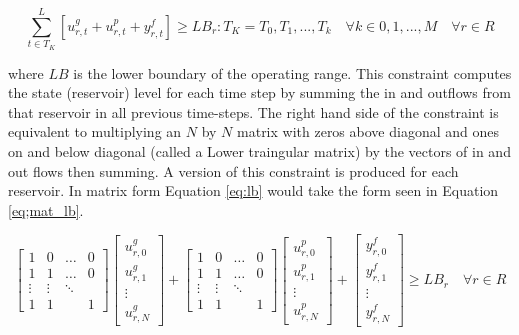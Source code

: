 \documentclass[12pt]{article}
\begin{document}
\begin{equation}
	\sum_{t\in T_K}^{L}[u_{r,t}^{g}+u_{r,t}^{p}+y_{r,t}^{f}]\geq LB_{r} : T_K=T_0,T_1,...,T_k \quad\forall k \in 0,1,...,M \quad\forall r \in R \label{eq:lb}
\end{equation}

where $LB$ is the lower boundary of the operating range. This constraint computes the state (reservoir) level for each time step by summing the in and outflows from that reservoir in all previous time-steps. The right hand side of the constraint is equivalent to multiplying an $N$ by $N$ matrix with zeros above diagonal and ones on and below diagonal (called a Lower traingular matrix) by the vectors of in and out flows then summing. A version of this constraint is produced for each reservoir. In matrix form Equation \eqref{eq:lb} would take the form seen in Equation \eqref{eq;mat_lb}.

\begin{equation}
	\begin{bmatrix}
		1 & 0 & \dots & 0\\
		1 & 1 & \dots & 0\\
		\vdots & \vdots &\ddots & \\
		1 & 1 & & 1
	\end{bmatrix}
	\begin{bmatrix}
		u_{r,0}^g \\ u_{r,1}^g \\ \vdots \\ u_{r,N}^g
	\end{bmatrix}+
	\begin{bmatrix}
		1 & 0 & \dots & 0\\
		1 & 1 & \dots & 0\\
		\vdots & \vdots &\ddots & \\
		1 & 1 & & 1
	\end{bmatrix}
	\begin{bmatrix}
		u_{r,0}^p \\ u_{r,1}^p \\ \vdots \\ u_{r,N}^p
	\end{bmatrix}+
	\begin{bmatrix}
		y_{r,0}^f \\ y_{r,1}^f \\ \vdots \\ y_{r,N}^f
	\end{bmatrix}\geq LB_r \quad \forall r \in R
	\label{eq;mat_lb}
\end{equation}
\end{document}
